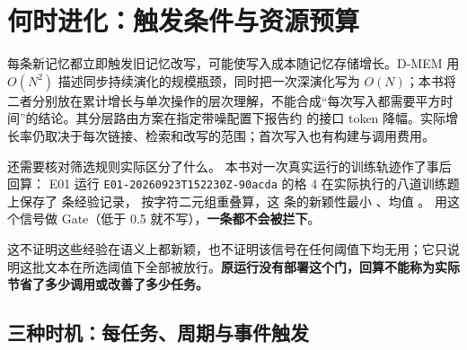 \chapter{何时进化：触发条件与资源预算}
\label{ch13}


\begin{failurebox}
每条新记忆都立即触发旧记忆改写，可能使写入成本随记忆存储增长。D-MEM 用 $O(N^2)$ 描述同步持续演化的规模瓶颈，同时把一次深演化写为 $O(N)$；本书将二者分别放在累计增长与单次操作的层次理解，不能合成“每次写入都需要平方时间”的结论。其分层路由方案在指定带噪配置下报告约 的接口 token 降幅\cite{dmem-2603}。实际增长率仍取决于每次链接、检索和改写的范围；首次写入也有构建与调用费用。

还需要核对筛选规则实际区分了什么。
本书对一次真实运行的训练轨迹作了事后回算：
E01 运行 \texttt{E01-20260923T152230Z-90acda} 的格 4 在实际执行的八道训练题上保存了  条经验记录，
按字符二元组重叠算，这  条的新颖性最小 、均值 。
用这个信号做 Gate（低于 0.5 就不写），\textbf{一条都不会被拦下}。

这不证明这些经验在语义上都新颖，也不证明该信号在任何阈值下均无用；它只说明这批文本在所选阈值下全部被放行。\textbf{原运行没有部署这个门，回算不能称为实际节省了多少调用或改善了多少任务。}
\end{failurebox}


\section{三种时机：每任务、周期与事件触发}
\label{sec:ch13-timing}

